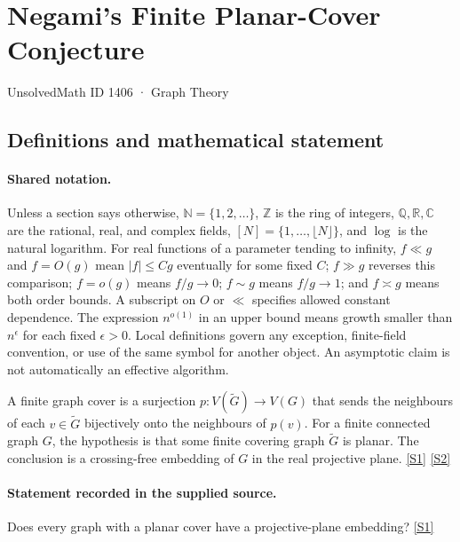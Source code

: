 \documentclass[11pt,a4paper]{article}
\newcommand{\N}{\mathbb{N}}
\newcommand{\Z}{\mathbb{Z}}
\newcommand{\Q}{\mathbb{Q}}
\newcommand{\R}{\mathbb{R}}
\newcommand{\C}{\mathbb{C}}
\newcommand{\sref}[2]{\hyperlink{source:#1:#2}{[S#2]}}
\begin{document}

\setcounter{section}{1405}

\section{Negami’s Finite Planar-Cover Conjecture}\label{1406}

{\small\sffamily UnsolvedMath ID 1406 · Graph Theory}

\subsection{Definitions and mathematical statement}

\paragraph{Shared notation.}Unless a section says otherwise, $\N=\{1,2,\ldots\}$,
$\Z$ is the ring of integers, $\Q,\R,\C$ are the rational, real, and complex
fields, $[N]=\{1,\ldots,\lfloor N\rfloor\}$, and $\log$ is the natural
logarithm. For real functions of a parameter tending to infinity,
$f\ll g$ and $f=O(g)$ mean $|f|\leq Cg$ eventually for some fixed $C$;
$f\gg g$ reverses this comparison; $f=o(g)$ means $f/g\to0$;
$f\sim g$ means $f/g\to1$; and $f\asymp g$ means both order bounds.
A subscript on $O$ or $\ll$ specifies allowed constant dependence.
The expression $n^{o(1)}$ in an upper bound means growth smaller than
$n^\epsilon$ for each fixed $\epsilon>0$. Local definitions govern any
exception, finite-field convention, or use of the same symbol for another
object. An asymptotic claim is not automatically an effective algorithm.



A finite graph cover is a surjection $p:V(\widetilde G)\to V(G)$ that sends the neighbours of each $v\in\widetilde G$ bijectively onto the neighbours of $p(v)$. For a finite connected graph $G$, the hypothesis is that some finite covering graph $\widetilde G$ is planar. The conclusion is a crossing-free embedding of $G$ in the real projective plane. \sref{1406}{1} \sref{1406}{2}

\paragraph{Statement recorded in the supplied source.}
Does every graph with a planar cover have a projective-plane embedding? \sref{1406}{1}
\end{document}
